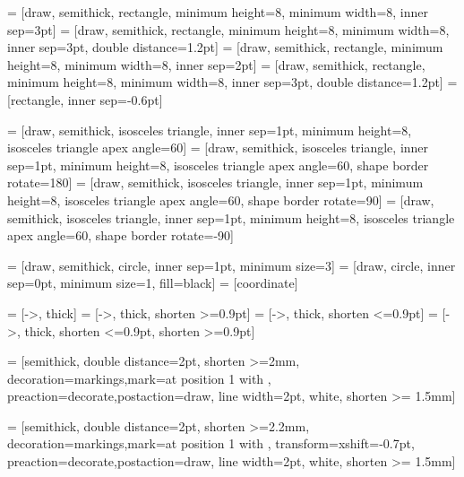 
\renewcommand{\TikZscale}{1}

        = [draw, semithick, rectangle, minimum height=8\mm, minimum width=8\mm, inner sep=3pt]
      = [draw, semithick, rectangle, minimum height=8\mm, minimum width=8\mm, inner sep=3pt, double distance=1.2pt]
     = [draw, semithick, rectangle, minimum height=8\mm, minimum width=8\mm, inner sep=2pt]
   = [draw, semithick, rectangle, minimum height=8\mm, minimum width=8\mm, inner sep=3pt, double distance=1.2pt]
       = [rectangle, inner sep=-0.6pt]

         = [draw, semithick, isosceles triangle, inner sep=1pt, minimum height=8\mm, isosceles triangle apex angle=60]
         = [draw, semithick, isosceles triangle, inner sep=1pt, minimum height=8\mm, isosceles triangle apex angle=60, shape border rotate=180]
         = [draw, semithick, isosceles triangle, inner sep=1pt, minimum height=8\mm, isosceles triangle apex angle=60, shape border rotate=90]
         = [draw, semithick, isosceles triangle, inner sep=1pt, minimum height=8\mm, isosceles triangle apex angle=60, shape border rotate=-90]

          = [draw, semithick, circle, inner sep=1pt, minimum size=3\mm]
       = [draw, circle, inner sep=0pt, minimum size=1\mm, fill=black]
       = [coordinate]


        = [->, thick]
      = [->, thick, shorten >=0.9pt]
      = [->, thick, shorten <=0.9pt]
    = [->, thick, shorten <=0.9pt, shorten >=0.9pt]
  
        = [semithick, double distance=2pt, shorten >=2mm, decoration={markings,mark=at position 1 with {}}, preaction={decorate},postaction={draw, line width=2pt, white, shorten >= 1.5mm}]
  
        = [semithick, double distance=2pt, shorten >=2.2mm, decoration={markings,mark=at position 1 with {}, transform={xshift=-0.7pt}}, preaction={decorate},postaction={draw, line width=2pt, white, shorten >= 1.5mm}]
  
